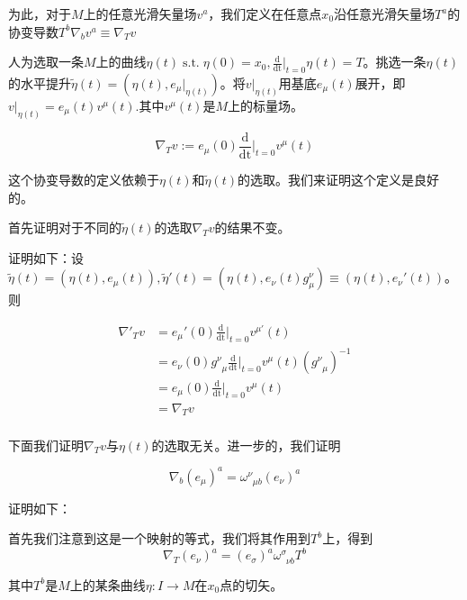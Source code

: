 \documentclass{ctexbook}
\begin{document}
为此，对于$M$上的任意光滑矢量场$v^{a}$，我们定义在任意点$x_0$沿任意光滑矢量场$T^{a}$的协变导数$T^{b}\nabla_b v^a\equiv\nabla_{T}v$

人为选取一条$M$上的曲线$\eta(t)\;\text{s.t.}\;\eta(0)=x_0,\frac{\mathrm{d}}{\mathrm{dt}}|_{t=0}\eta(t)=T$。挑选一条$\eta(t)$的水平提升$\tilde{\eta}(t)=(\eta(t),e_{\mu}|_{\eta(t)})$。将$v|_{\eta(t)}$用基底$e_{\mu}(t)$展开，即$v|_{\eta(t)}=e_{\mu}(t)v^{\mu}(t)$.其中$v^{\mu}(t)$是$M$上的标量场。

\begin{equation}
    \nabla_T v:=e_{\mu}(0)\frac{\mathrm{d}}{\mathrm{dt}}|_{t=0}v^{\mu}(t)
\end{equation}

这个协变导数的定义依赖于$\eta(t)$和$\tilde{\eta}(t)$的选取。我们来证明这个定义是良好的。

首先证明对于不同的$\tilde{\eta}(t)$的选取$\nabla_T v$的结果不变。

证明如下：设$\tilde{\eta}(t)=(\eta(t),e_{\mu}(t)),\tilde{\eta}'(t)=(\eta(t),e_{\nu}(t)g^{\nu}_{\mu})\equiv(\eta(t),e_{\nu}'(t))$。则

\begin{equation}
    \begin{split}
        \nabla'_{T}v
        &=e_{\mu}'(0)\frac{\mathrm{d}}{\mathrm{dt}}|_{t=0}v^{\mu'}(t)\\
        &=e_{\nu}(0)g^{\nu}_{\;\;\mu}\frac{\mathrm{d}}{\mathrm{dt}}|_{t=0}v^{\mu}(t)(g^{\nu}_{\;\;\mu})^{-1}\\
        &=e_{\mu}(0)\frac{\mathrm{d}}{\mathrm{dt}}|_{t=0}v^{\mu}(t)\\
        &=\nabla_{T}v\\
    \end{split}
\end{equation}

下面我们证明$\nabla_T v$与$\eta(t)$的选取无关。进一步的，我们证明

\begin{equation}
    \nabla_{b}(e_{\mu})^a=\omega^{\nu}_{\;\;\mu b}(e_{\nu})^a
\end{equation}

证明如下：

首先我们注意到这是一个映射的等式，我们将其作用到$T^{b}$上，得到
\begin{equation}
    \nabla_{T}(e_\nu)^a=(e_\sigma)^a\omega^{\sigma}_{\;\;\nu b}T^{b}
\end{equation}

其中$T^b$是$M$上的某条曲线$\eta\colon I\to M$在$x_0$点的切矢。
\end{document}
